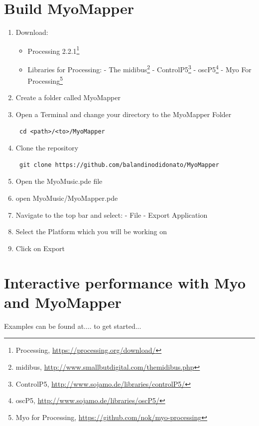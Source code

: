 \documentclass[12pt,a4paper]{article}
\begin{document}
\section{Build MyoMapper}
\begin{enumerate}
	\item Download:
	\begin{itemize}
		\item Processing 2.2.1\footnote{Processing, \url{https://processing.org/download/}} \\
		\item Libraries for Processing:
		\subitem - The midibus\footnote{midibus, \url{http://www.smallbutdigital.com/themidibus.php}}
		\subitem - ControlP5\footnote{ControlP5, \url{http://www.sojamo.de/libraries/controlP5/}}
		\subitem - oscP5\footnote{oscP5, \url{http://www.sojamo.de/libraries/oscP5/}}
		\subitem - Myo For Processing\footnote{Myo for Processing, \url{https://github.com/nok/myo-processing}}
	\end{itemize}
	\item Create a folder called MyoMapper
	\item Open a Terminal and change your directory to the MyoMapper Folder
	\begin{verbatim} cd <path>/<to>/MyoMapper \end{verbatim}
	\item Clone the repository
	\begin{verbatim} git clone https://github.com/balandinodidonato/MyoMapper \end{verbatim}
	\item Open the MyoMusic.pde file
	\item open MyoMusic/MyoMapper.pde
	\item Navigate to the top bar and select:
	\subitem - File
	\subitem - Export Application 
	\item Select the Platform which you will be working on
	\item Click on Export
\end{enumerate}

\newpage
\section{Interactive performance with Myo and MyoMapper}
Examples can be found at....
to get started...
\end{document}
